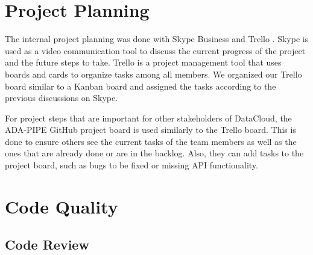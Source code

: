\documentclass{article}
\begin{document}
    \section{Project Planning}
    \label{sec:project-planning}

        The internal project planning was done with Skype Business \cite{microsoftSkypeStayConnected} and Trello \cite{atlassianManageYourTeam}.
        Skype is used as a video communication tool to discuss the current progress of the project and the future steps to take.
        Trello is a project management tool that uses boards and cards to organize tasks among all members.
        We organized our Trello board similar to a Kanban board and assigned the tasks according to the previous discussions on Skype.
        
        For project steps that are important for other stakeholders of DataCloud, the ADA-PIPE GitHub project board is used similarly to the Trello board. This is done to ensure others see the current tasks of the team members as well as the ones that are already done or are in the backlog. Also, they can add tasks to the project board, such as bugs to be fixed or missing API functionality.
        
    \section{Code Quality}
    \label{sec:code-quality}


        \subsection{Code Review}
        \label{sec:code-review-code-quality}
\end{document}
